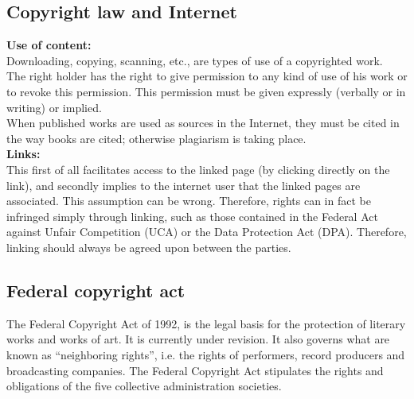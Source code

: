 \subsection{Copyright law and Internet}
\textbf{Use of content:} \\
Downloading, copying, scanning, etc., are types of use of a copyrighted work. \\
The right holder has the right to give permission to any kind of use of his work or to revoke this permission. This permission must be given expressly (verbally or in writing) or implied. \\
When published works are used as sources in the Internet, they must be cited in the way books are cited; otherwise plagiarism is taking place. \\
\textbf{Links:} \\
This first of all facilitates access to the linked page (by clicking directly on the link), and secondly implies to the internet user that the linked pages are associated. This assumption can be wrong. Therefore, rights can in fact be infringed simply through linking, such as those contained in the Federal Act against Unfair Competition (UCA) or the Data
Protection Act (DPA). Therefore, linking should always be agreed upon between the parties.

\subsection{Federal copyright act}
The Federal Copyright Act of 1992, is the legal basis for the protection of literary works and works of art. It is currently under revision. It also governs what are known as “neighboring rights”, i.e. the rights of performers, record producers and broadcasting companies. The Federal Copyright Act stipulates the rights and obligations of the five
collective administration societies.